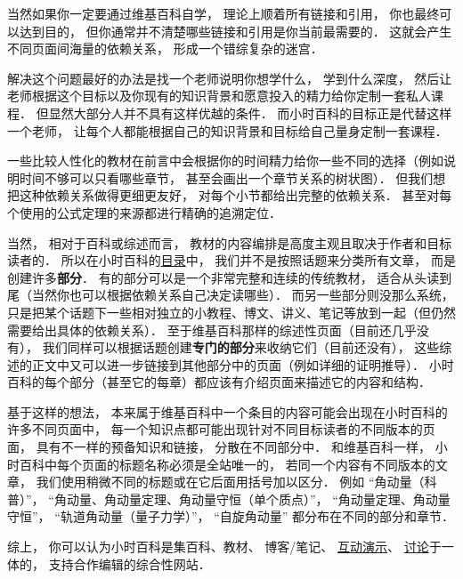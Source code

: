 当然如果你一定要通过维基百科自学， 理论上顺着所有链接和引用， 你也最终可以达到目的， 但你通常并不清楚哪些链接和引用是你当前最需要的． 这就会产生不同页面间海量的依赖关系， 形成一个错综复杂的迷宫．

解决这个问题最好的办法是找一个老师说明你想学什么， 学到什么深度， 然后让老师根据这个目标以及你现有的知识背景和愿意投入的精力给你定制一套私人课程． 但显然大部分人并不具有这样优越的条件． 而小时百科的目标正是代替这样一个老师， 让每个人都能根据自己的知识背景和目标给自己量身定制一套课程．

一些比较人性化的教材在前言中会根据你的时间精力给你一些不同的选择（例如说明时间不够可以只看哪些章节， 甚至会画出一个章节关系的树状图）． 但我们想把这种依赖关系做得更细更友好， 对每个小节都给出完整的依赖关系． 甚至对每个使用的公式定理的来源都进行精确的追溯定位．

当然， 相对于百科或综述而言， 教材的内容编排是高度主观且取决于作者和目标读者的． 所以在小时百科的\href{http://wuli.wiki/online}{目录}中， 我们并不是按照话题来分类所有文章， 而是创建许多\textbf{部分}． 有的部分可以是一个非常完整和连续的传统教材， 适合从头读到尾（当然你也可以根据依赖关系自己决定读哪些）． 而另一些部分则没那么系统， 只是把某个话题下一些相对独立的小教程、博文、讲义、笔记等放到一起（但仍然需要给出具体的依赖关系）． 至于维基百科那样的综述性页面（目前还几乎没有）， 我们同样可以根据话题创建\textbf{专门的部分}来收纳它们（目前还没有）， 这些综述的正文中又可以进一步链接到其他部分中的页面（例如详细的证明推导）． 小时百科的每个部分（甚至它的每章）都应该有介绍页面来描述它的内容和结构．

基于这样的想法， 本来属于维基百科中一个条目的内容可能会出现在小时百科的许多不同页面中， 每一个知识点都可能出现针对不同目标读者的不同版本的页面， 具有不一样的预备知识和链接， 分散在不同部分中． 和维基百科一样， 小时百科中每个页面的标题名称必须是全站唯一的， 若同一个内容有不同版本的文章， 我们使用稍微不同的标题或在它后面用括号加以区分． 例如 “角动量（科普）”， “角动量、角动量定理、角动量守恒（单个质点）”， “角动量定理、角动量守恒”， “轨道角动量（量子力学）”， “自旋角动量” 都分布在不同的部分和章节．

综上， 你可以认为小时百科是集百科、教材、 博客/笔记、 \href{http://wuli.wiki/apps}{互动演示}、 \href{http://wuli.wiki/forum}{讨论}于一体的， 支持合作编辑的综合性网站．


